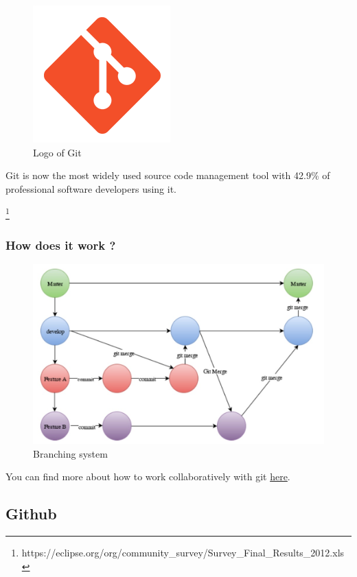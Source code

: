 \documentclass[a4paper]{report}
\begin{document}
\begin{figure}[H]
	\centering
	\includegraphics[width=0.2\linewidth]{image/git.png}
	\caption{Logo of Git}
	\label{fig:git_logo}
\end{figure}

Git is now the most widely used source code management tool with 42.9\% of professional software developers using it.

\footnote{https://eclipse.org/org/community\_survey/Survey\_Final\_Results\_2012.xls}

\subsubsection{How does it work ?}



\begin{figure}[H]
	\centering
	\includegraphics[width=1\linewidth]{image/GitBranch.jpg}
	\caption{Branching system}
	\label{fig:gitbranch_logo}
\end{figure}

You can find more about how to work collaboratively with git \href{https://www.atlassian.com/git/tutorials/comparing-workflows}{here}.

\subsection{Github}
\end{document}
